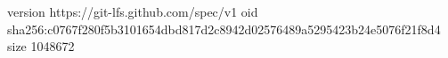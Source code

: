 version https://git-lfs.github.com/spec/v1
oid sha256:c0767f280f5b3101654dbd817d2c8942d02576489a5295423b24e5076f21f8d4
size 1048672
